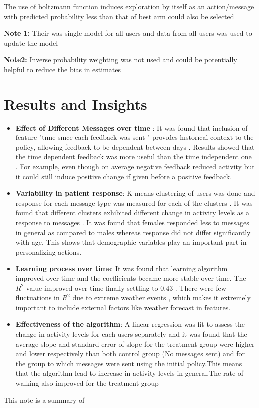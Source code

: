 \documentclass[11pt]{article}
\begin{document}
\begin{flushleft}The use of boltzmann function induces exploration by itself as an action/message with predicted probability less than that of best arm could also be selected
\end{flushleft}

\textbf{Note 1:} Their was single model for all users and data from all users was used to update  the model 

\textbf{Note2:} Inverse probability weighting was not used and could be potentially helpful to reduce the bias in estimates

\section{Results and Insights}
\begin{itemize}
\item  \textbf{Effect of Different Messages over time} :
It was found that inclusion of feature "time since each feedback was sent " provides historical context to the policy, allowing feedback to be dependent between days . Results showed that the time dependent feedback was more useful than the time independent one . For example, even though on average negative feedback reduced activity but it could still induce positive change if given before a positive feedback.
\item  \textbf{Variability in patient response}:
K means clustering of users was done and response for each message type was measured for each of the clusters . It was found that different clusters exhibited different change in activity levels as a response to messages . It was found that females responded less to messages in general as compared to males whereas response did not differ significantly with age. This shows that demographic variables play an important part in personalizing actions.
\item  \textbf{Learning process over time}:
It was found that learning algorithm improved over time and the coefficients became more stable over time. The $R^2$ value improved over time finally settling to 0.43 . There were few fluctuations in $R^2$ due to extreme weather events , which makes it extremely important to include external factors like weather forecast in features.
\item  \textbf{Effectiveness of the algorithm}:
A linear regression was fit to assess the change in activity levels for each users separately and it was found that the average slope and standard error of slope for the treatment group were higher and lower respectively than both control group (No messages sent) and for the group to which messages were sent using the initial policy.This means that the algorithm lead to increase in activity levels in general.The rate of walking also improved for the treatment group


\end{itemize}

This note is a summary of  \cite{hochberg2016reinforcement}

 
\end{document}
